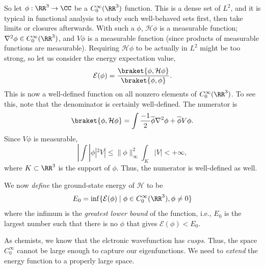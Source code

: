 So let $\phi : \RR^3 \to \CC$ be a $C^\infty_0(\RR^3)$ function. This is a dense set of $L^2$, and it is typical in functional analysis to study such well-behaved sets first, then take limits or closures afterwards. With such a $\phi$,  $\mathcal{H}\phi$ is a measurable function; $\nabla^2\phi \in C^\infty_0(\RR^3)$, and $V\phi$ is a measurable function (since products of measurable functions are measurable). Requiring $\mathcal{H}\phi$ to be actually in $L^2$ might be too strong, so let us consider the energy expectation value,
\begin{equation}
\mathcal{E}(\phi) = \frac{\braket{\phi,\mathcal{H}\phi}}{\braket{\phi,\phi}}. 
\end{equation}
This is now a well-defined function on all nonzero elements of $C^\infty_0(\RR^3)$.  To see this, note that the denominator is certainly well-defined. The numerator is
\begin{equation}
    \braket{\phi,\mathcal{H}\phi} = \int \frac{-1}{2} \overline{\phi} \nabla^2 \phi + \overline{\phi} V\phi.
\end{equation}
Since $V\phi$ is measurable,
\begin{equation}
    |\int |\phi|^2 V | \leq \|\phi\|_\infty^2 \int_K |V| < + \infty,
\end{equation}
where $K\subset \RR^3$ is the support of $\phi$. Thus, the numerator is well-defined as well.

We now \emph{define} the ground-state energy of $\mathcal{H}$ to be
\begin{equation}
    E_0 = \inf \{ \mathcal{E}(\phi) \mid \phi \in C^\infty_0(\RR^3), \phi \neq 0 \}
\end{equation}
where the infimum is the \emph{greatest lower bound} of the function, i.e., $E_0$ is the largest number such that there is no $\phi$ that gives $\mathcal{E}(\phi) < E_0$. 

As chemists, we know that the elctronic wavefunction has \emph{cusps}. Thus, the space $C^\infty_0$ cannot be large enough to capture our eigenfunctions. We need to \emph{extend} the energy function to a properly large space.


